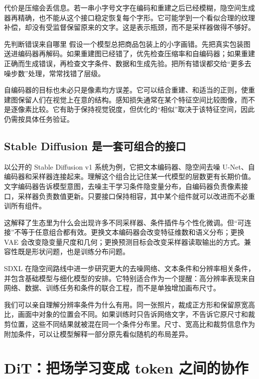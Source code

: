 代价是压缩会丢信息。若一串小字号文字在编码和重建之后已经模糊，隐空间生成器再精确，也不能从这个接口稳定恢复每个字形。它可能学到一个看似合理的纹理补偿，却没有受监督保留原来的文字。这是表示瓶颈，而不是采样器做得不够好。

\begin{examplebox}{先判断错误来自哪里}
假设一个模型总把商品包装上的小字画错。先把真实包装图送进编码器再解码。如果重建图已经错了，优先检查压缩率和自编码器；如果重建正确而生成错误，再检查文字条件、数据和生成先验。把所有错误都交给“更多去噪步数”处理，常常找错了层级。
\end{examplebox}

自编码器的目标也未必只是像素均方误差。它可以结合重建、和适当的正则，使重建图保留人们在视觉上在意的结构。感知损失通常在某个特征空间比较图像，而不是逐像素比较。它有助于保持视觉锐度，但优化的“相似”取决于该特征空间，因此仍需按具体任务验证。

\subsection{Stable Diffusion 是一套可组合的接口}

以公开的 Stable Diffusion v1 系统为例，它把文本编码器、隐空间去噪 U-Net、自编码器和采样器连接起来。\cite{a_sdcard}理解这个组合比记住某一代模型的层数更有长期价值。文字编码器告诉模型意图，去噪主干学习条件隐变量分布，自编码器负责像素接口，采样器负责数值更新。只要接口保持相容，其中某个组件就可以改进而不必重训所有组件。

这解释了生态里为什么会出现许多不同采样器、条件插件与个性化微调。但“可连接”不等于任意组合都有效。更换文本编码器会改变特征维数和语义分布；更换 VAE 会改变隐变量尺度和几何；更换预测目标会改变采样器读取输出的方式。兼容性既是形状问题，也是训练分布问题。

SDXL 在隐空间路线中进一步研究更大的去噪网络、文本条件和分辨率相关条件，并包含基础模型与细化模型的安排。它特别适合作为一个提醒：高分辨率表现来自网络、数据、训练任务和条件的联合工程，而不是单独增加画布尺寸。\cite{a_sdxl}

我们可以亲自理解分辨率条件为什么有用。同一张照片，裁成正方形和保留原宽高比，画面中对象的位置会不同。如果训练时只告诉网络文字，不告诉它原尺寸和裁剪位置，这些不同结果就被混在同一个条件分布里。尺寸、宽高比和裁剪信息作为附加条件，可以让模型解释一部分原先看似随机的布局差异。

\section{DiT：把场学习变成 token 之间的协作}
\label{sec:application-dit}

